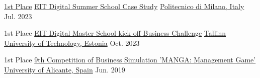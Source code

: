 



\begin{cvhonors}

  \cvhonor
    {\href{http://bit.ly/3u6Lm2b}{1st Place}} %
    {\href{https://www.instagram.com/p/Cu9dOXZswlK/?img_index=9}{EIT Digital Summer School Case Study}} %
    {\href{https://www.polimi.it/}{Politecnico di Milano, Italy}} %
    {Jul. 2023} %
    
  \cvhonor
	{1st Place} %
	{\href{https://www.eitdigital.eu/newsroom/news/2022/eit-digital-master-school-kicks-off-academic-year-2022/}{EIT Digital Master School kick off Business Challenge}} %
	{\href{https://taltech.ee/en/}{Tallinn University of Technology, Estonia}} %
	{Oct. 2023} %

  \cvhonor
	{1st Place} %
	{\href{https://economicas.ua.es/es/actividades-y-eventos/juego-de-simulacion/ediciones-anteriores/juego-de-simulacion-empresarial-2018-19.html}{9th Competition of Business Simulation 'MANGA: Management Game'}} %
	{\href{https://www.ua.es/en/}{University of Alicante, Spain}} %
	{Jun. 2019} %

\end{cvhonors}


